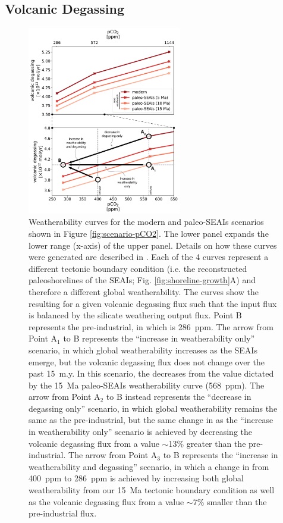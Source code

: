 \subsection{Volcanic Degassing}

\begin{figure}[h!]
\begin{center}
	\includegraphics[width=0.6\textwidth]{figures/SEAIs/weatherability-curves.pdf}
	\caption[Weatherability curves.]{Weatherability curves for the modern and paleo-SEAIs scenarios shown in Figure \ref{fig:scenario-pCO2}. The lower panel expands the lower \pCOtwo range (x-axis) of the upper panel. Details on how these curves were generated are described in \MM. Each of the 4 curves represent a different tectonic boundary condition (i.e. the reconstructed paleoshorelines of the SEAIs; Fig. \ref{fig:shoreline-growth}A) and therefore a different global weatherability. The curves show the resulting \pCOtwo for a given volcanic degassing flux such that the input flux is balanced by the silicate weathering output flux. Point B represents the pre-industrial, in which \pCOtwo is 286~ppm. The arrow from Point A$_{1}$ to B represents the ``increase in weatherability only'' scenario, in which global weatherability increases as the SEAIs emerge, but the volcanic degassing flux does not change over the past 15~m.y. In this scenario, the \pCOtwo decreases from the value dictated by the 15~Ma paleo-SEAIs weatherability curve (568~ppm). The arrow from Point A$_{2}$ to B instead represents the ``decrease in degassing only'' scenario, in which global weatherability remains the same as the pre-industrial, but the same change in \pCOtwo as the ``increase in weatherability only'' scenario is achieved by decreasing the volcanic degassing flux from a value $\sim$13\% greater than the pre-industrial. The arrow from Point A$_{3}$ to B represents the ``increase in weatherability and degassing'' scenario, in which a change in \pCOtwo from 400~ppm to 286~ppm is achieved by increasing both global weatherability from our 15~Ma tectonic boundary condition as well as the volcanic degassing flux from a value $\sim$7\% smaller than the pre-industrial flux.}
	\label{fig:weatherability-curves}
\end{center}
\end{figure}

